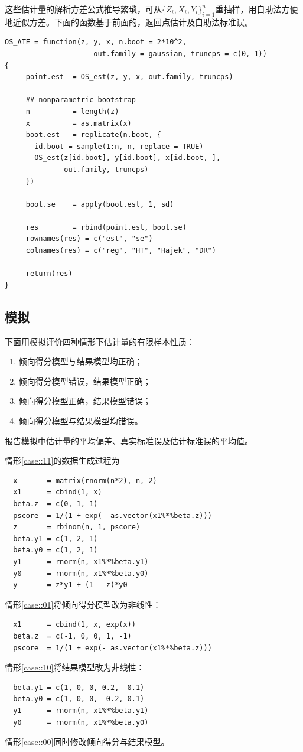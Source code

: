 这些估计量的解析方差公式推导繁琐，可从$\{ Z_i, X_i, Y_i \}_{i=1}^n$重抽样，用自助法方便地近似方差。下面的函数基于前面的，返回点估计及自助法标准误。 


\begin{lstlisting}
OS_ATE = function(z, y, x, n.boot = 2*10^2,
                     out.family = gaussian, truncps = c(0, 1))
{
     point.est  = OS_est(z, y, x, out.family, truncps)
     
     ## nonparametric bootstrap
     n          = length(z)
     x          = as.matrix(x)
     boot.est   = replicate(n.boot, {
       id.boot = sample(1:n, n, replace = TRUE)
       OS_est(z[id.boot], y[id.boot], x[id.boot, ], 
              out.family, truncps)
     })

     boot.se    = apply(boot.est, 1, sd)
     
     res        = rbind(point.est, boot.se)
     rownames(res) = c("est", "se")
     colnames(res) = c("reg", "HT", "Hajek", "DR")
     
     return(res)
}
\end{lstlisting}




\subsection{模拟}
\label{sec::dr-simulation}


下面用模拟评价四种情形下估计量的有限样本性质：
\begin{enumerate}
\item\label{case::11}
倾向得分模型与结果模型均正确；
\item\label{case::01}
倾向得分模型错误，结果模型正确；
\item\label{case::10}
倾向得分模型正确，结果模型错误；
\item\label{case::00}
倾向得分模型与结果模型均错误。
\end{enumerate}
报告模拟中估计量的平均偏差、真实标准误及估计标准误的平均值。 



情形\ref{case::11}的数据生成过程为
\begin{lstlisting}
  x       = matrix(rnorm(n*2), n, 2)
  x1      = cbind(1, x)
  beta.z  = c(0, 1, 1)
  pscore  = 1/(1 + exp(- as.vector(x1%*%beta.z)))
  z       = rbinom(n, 1, pscore)
  beta.y1 = c(1, 2, 1)
  beta.y0 = c(1, 2, 1)
  y1      = rnorm(n, x1%*%beta.y1)
  y0      = rnorm(n, x1%*%beta.y0)
  y       = z*y1 + (1 - z)*y0
\end{lstlisting}
情形\ref{case::01}将倾向得分模型改为非线性：
\begin{lstlisting}
  x1      = cbind(1, x, exp(x))
  beta.z  = c(-1, 0, 0, 1, -1)
  pscore  = 1/(1 + exp(- as.vector(x1%*%beta.z)))
\end{lstlisting}
情形\ref{case::10}将结果模型改为非线性： 
\begin{lstlisting}
  beta.y1 = c(1, 0, 0, 0.2, -0.1)
  beta.y0 = c(1, 0, 0, -0.2, 0.1)
  y1      = rnorm(n, x1%*%beta.y1)
  y0      = rnorm(n, x1%*%beta.y0)
\end{lstlisting}
情形\ref{case::00}同时修改倾向得分与结果模型。 


